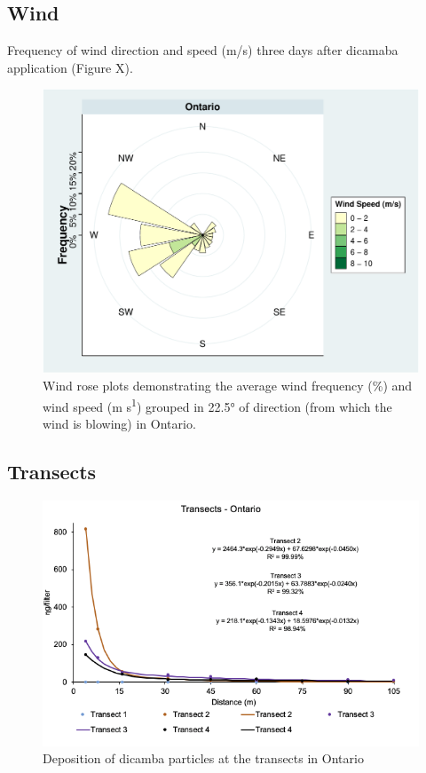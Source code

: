 \documentclass[]{article}
\begin{document}
\pagebreak
\newpage

\subsection{Wind}\label{wind-4}

Frequency of wind direction and speed (m/s) three days after dicamaba
application (Figure X).

\begin{figure}
\centering
\includegraphics{Report_Dicamba_study_files/figure-latex/unnamed-chunk-82-1.pdf}
\caption{Wind rose plots demonstrating the average wind frequency (\%)
and wind speed (m s\textsuperscript{1}) grouped in 22.5° of direction
(from which the wind is blowing) in Ontario.}
\end{figure}

\pagebreak
\newpage

\subsection{Transects}\label{transects-4}

\begin{figure}[h]

{\centering \includegraphics[width=1\linewidth]{ONtransect} 

}

\caption{Deposition of dicamba particles at the transects in Ontario}\label{fig:unnamed-chunk-83}
\end{figure}
\end{document}
